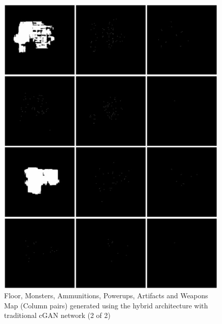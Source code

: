 \documentclass{Configuration_Files/PoliMi3i_thesis}
\begin{document}
\begin{figure}[H]
    \centering
    \includegraphics[width=1\textwidth]{trad_cgan_sample2.jpg}
    \caption[Samples generated using the traditional cGAN network (2 of 2)]{Floor, Monsters, Ammunitions, Powerups, Artifacts and Weapons Map 
(Column pairs) generated using the hybrid architecture with traditional cGAN network (2 of 2)}
    \label{fig:tradcgansample1}
\end{figure}
\end{document}
